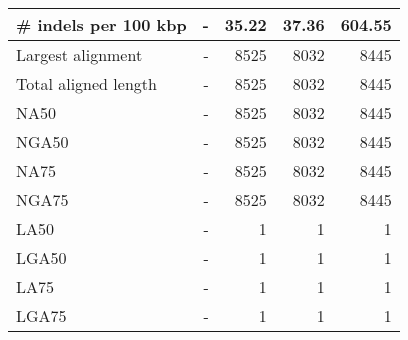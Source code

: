 \documentclass[12pt,a4paper]{article}
\begin{document}
\begin{table}[ht]
\begin{center}
\begin{tabular}{|l*{4}{|r}|}
\# indels per 100 kbp & - & 35.22 & 37.36 & 604.55 \\ \hline
Largest alignment & - & 8525 & 8032 & 8445 \\ \hline
Total aligned length & - & 8525 & 8032 & 8445 \\ \hline
NA50 & - & 8525 & 8032 & 8445 \\ \hline
NGA50 & - & 8525 & 8032 & 8445 \\ \hline
NA75 & - & 8525 & 8032 & 8445 \\ \hline
NGA75 & - & 8525 & 8032 & 8445 \\ \hline
LA50 & - & 1 & 1 & 1 \\ \hline
LGA50 & - & 1 & 1 & 1 \\ \hline
LA75 & - & 1 & 1 & 1 \\ \hline
LGA75 & - & 1 & 1 & 1 \\ \hline
\end{tabular}
\end{center}
\end{table}
\end{document}
